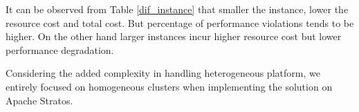 It can be observed from Table \ref{dif_instance} that smaller the instance, lower the resource cost and total cost. But percentage of performance violations tends to be higher. On the other hand larger instances incur higher resource cost but lower performance degradation. 

Considering the added complexity in handling heterogeneous platform, we entirely focused on homogeneous clusters when implementing the solution on Apache Stratos.